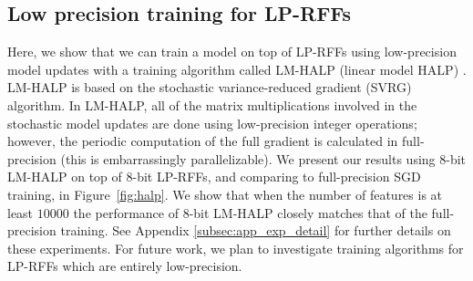 \vsp
\subsection{Low precision training for LP-RFFs}
\label{sec:halp}
Here, we show that we can train a model on top of LP-RFFs using low-precision model updates with a training algorithm called LM-HALP (linear model HALP) \citep{halp18}. LM-HALP is based on the stochastic variance-reduced gradient (SVRG) algorithm. In LM-HALP, all of the matrix multiplications involved in the stochastic model updates are done using low-precision integer operations; however, the periodic computation of the full gradient is calculated in full-precision (this is embarrassingly parallelizable). We present our results using 8-bit LM-HALP on top of 8-bit LP-RFFs, and comparing to full-precision SGD training, in Figure~\ref{fig:halp}. We show that when the number of features is at least $\num[group-separator={,}]{10000}$ the performance of 8-bit LM-HALP closely matches that of the full-precision training.  See Appendix \ref{subsec:app_exp_detail} for further details on these experiments. For future work, we plan to investigate training algorithms for LP-RFFs which are entirely low-precision.


